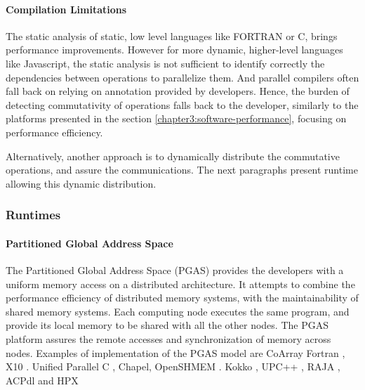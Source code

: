 

\paragraph{Compilation Limitations}

The static analysis of static, low level languages like FORTRAN or C, brings performance improvements.
However for more dynamic, higher-level languages like Javascript, the static analysis is not sufficient to identify correctly the dependencies between operations to parallelize them.
And parallel compilers often fall back on relying on annotation provided by developers.
Hence, the burden of detecting commutativity of operations falls back to the developer, similarly to the platforms presented in the section \ref{chapter3:software-performance}, focusing on performance efficiency.

Alternatively, another approach is to dynamically distribute the commutative operations, and assure the communications.
The next paragraphs present runtime allowing this dynamic distribution.

\subsubsection{Runtimes} \label{chapter3:software-abstraction:runtimes}

\paragraph{Partitioned Global Address Space}

The Partitioned Global Address Space (PGAS) provides the developers with a uniform memory access on a distributed architecture.
It attempts to combine the performance efficiency of distributed memory systems, with the maintainability of shared memory systems.
Each computing node executes the same program, and provide its local memory to be shared with all the other nodes.
The PGAS platform assures the remote accesses and synchronization of memory across nodes.
Examples of implementation of the PGAS model are 
CoArray Fortran \cite{Numrich1998},
X10 \cite{Charles2005}.
Unified Parallel C \cite{El-Ghazawi2006},
Chapel\cite{Chamberlain2007},
OpenSHMEM \cite{Chapman2010}.
Kokko \cite{Edwards2012},
UPC++ \cite{Zheng2014},
RAJA \cite{Hornung2014},
ACPdl \cite{Ajima2015} and
HPX \cite{Kaiser2014,Kaiser2015}


